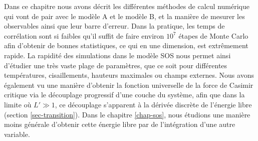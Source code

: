 Dans ce chapitre nous avons décrit les différentes méthodes de calcul numérique qui vont de pair avec le modèle A et le modèle B, et la manière de mesurer les observables ainsi que leur barre d'erreur. Dans la pratique, les temps de corrélation sont si faibles qu'il suffit de faire environ $10^7$ étapes de Monte Carlo afin d'obtenir de bonnes statistiques, ce qui en une dimension, est extrêmement rapide. La rapidité des simulations dans le modèle SOS nous permet ainsi d'étudier une très vaste plage de paramètres, que ce soit pour différentes températures, cisaillements, hauteurs maximales ou champs externes. 
Nous avons également vu une manière d'obtenir la fonction universelle de la force de Casimir critique via le découplage progressif d'une couche du système, afin que dans la limite où $L' \gg 1$, ce découplage s'apparent à la dérivée discrète de l'énergie libre (section \ref{sec-transition}). Dans le chapitre \ref{chap-sos}, nous étudions une manière moins générale d'obtenir cette énergie libre par de l'intégration d'une autre variable.